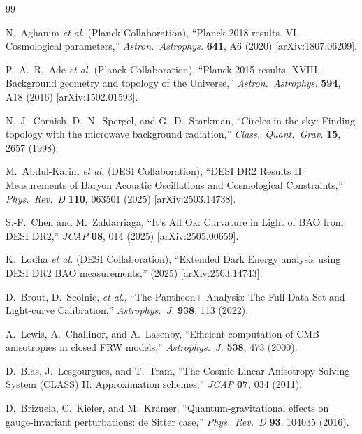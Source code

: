 \documentclass[twocolumn,aps,prd,showpacs,nofootinbib,superscriptaddress]{revtex4-2}
\begin{document}
\begin{thebibliography}{99}

N.~Aghanim \textit{et al.} (Planck Collaboration),
``Planck 2018 results. VI. Cosmological parameters,''
\emph{Astron.\ Astrophys.} \textbf{641}, A6 (2020) [arXiv:1807.06209].

P.~A.~R.~Ade \textit{et al.} (Planck Collaboration),
``Planck 2015 results. XVIII. Background geometry and topology of the Universe,''
\emph{Astron.\ Astrophys.} \textbf{594}, A18 (2016) [arXiv:1502.01593].

N.~J.~Cornish, D.~N.~Spergel, and G.~D.~Starkman,
``Circles in the sky: Finding topology with the microwave background radiation,''
\emph{Class.\ Quant.\ Grav.} \textbf{15}, 2657 (1998).

M.~Abdul-Karim \textit{et al.} (DESI Collaboration),
``DESI DR2 Results II: Measurements of Baryon Acoustic Oscillations and Cosmological Constraints,''
\emph{Phys.\ Rev.\ D} \textbf{110}, 063501 (2025) [arXiv:2503.14738].

S.-F.~Chen and M.~Zaldarriaga,
``It’s All Ok: Curvature in Light of BAO from DESI DR2,''
\emph{JCAP} \textbf{08}, 014 (2025) [arXiv:2505.00659].

K.~Lodha \textit{et al.} (DESI Collaboration),
``Extended Dark Energy analysis using DESI DR2 BAO measurements,''
(2025) [arXiv:2503.14743].

D.~Brout, D.~Scolnic, \textit{et al.},
``The Pantheon+ Analysis: The Full Data Set and Light-curve Calibration,''
\emph{Astrophys.\ J.} \textbf{938}, 113 (2022).

A.~Lewis, A.~Challinor, and A.~Lasenby,
``Efficient computation of CMB anisotropies in closed FRW models,''
\emph{Astrophys.\ J.} \textbf{538}, 473 (2000).

D.~Blas, J.~Lesgourgues, and T.~Tram,
``The Cosmic Linear Anisotropy Solving System (CLASS) II: Approximation schemes,''
\emph{JCAP} \textbf{07}, 034 (2011).

D.~Brizuela, C.~Kiefer, and M.~Kr\"amer,
``Quantum-gravitational effects on gauge-invariant perturbations: de Sitter case,''
\emph{Phys.\ Rev.\ D} \textbf{93}, 104035 (2016).


\end{thebibliography}
\end{document}
